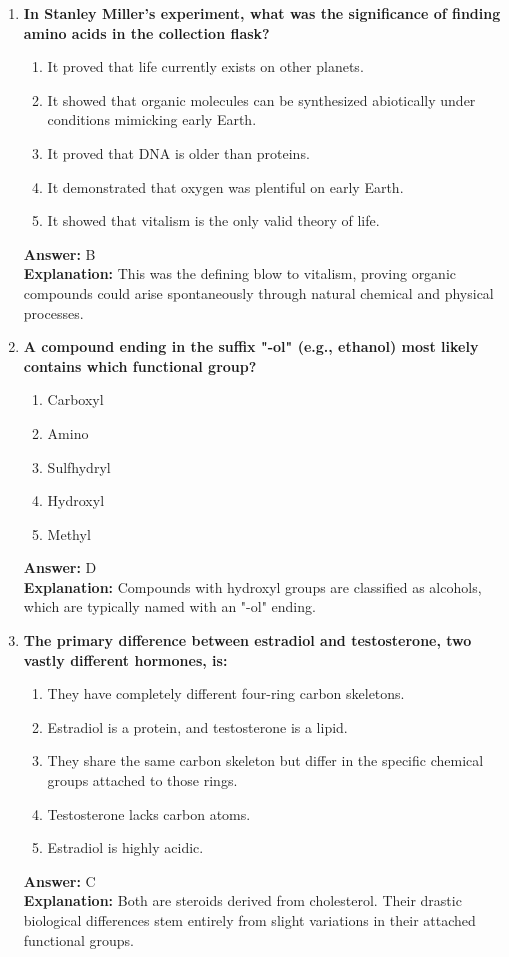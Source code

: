 \documentclass[11pt, a4paper]{article}
\begin{document}
\begin{enumerate}
\item \textbf{In Stanley Miller's experiment, what was the significance of finding amino acids in the collection flask?}
\begin{enumerate}[label=\Alph*.]
    \item It proved that life currently exists on other planets.
    \item It showed that organic molecules can be synthesized abiotically under conditions mimicking early Earth.
    \item It proved that DNA is older than proteins.
    \item It demonstrated that oxygen was plentiful on early Earth.
    \item It showed that vitalism is the only valid theory of life.
\end{enumerate}
\textbf{Answer:} B \\
\textbf{Explanation:} This was the defining blow to vitalism, proving organic compounds could arise spontaneously through natural chemical and physical processes.

\item \textbf{A compound ending in the suffix "-ol" (e.g., ethanol) most likely contains which functional group?}
\begin{enumerate}[label=\Alph*.]
    \item Carboxyl
    \item Amino
    \item Sulfhydryl
    \item Hydroxyl
    \item Methyl
\end{enumerate}
\textbf{Answer:} D \\
\textbf{Explanation:} Compounds with hydroxyl groups are classified as alcohols, which are typically named with an "-ol" ending.

\item \textbf{The primary difference between estradiol and testosterone, two vastly different hormones, is:}
\begin{enumerate}[label=\Alph*.]
    \item They have completely different four-ring carbon skeletons.
    \item Estradiol is a protein, and testosterone is a lipid.
    \item They share the same carbon skeleton but differ in the specific chemical groups attached to those rings.
    \item Testosterone lacks carbon atoms.
    \item Estradiol is highly acidic.
\end{enumerate}
\textbf{Answer:} C \\
\textbf{Explanation:} Both are steroids derived from cholesterol. Their drastic biological differences stem entirely from slight variations in their attached functional groups.


\end{enumerate}
\end{document}
